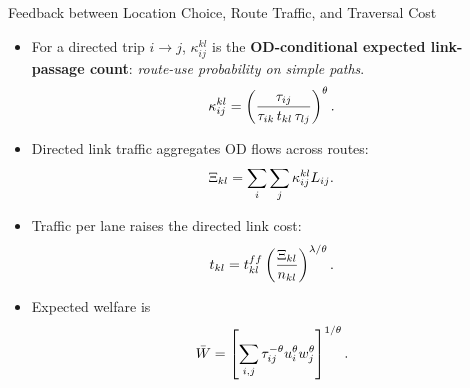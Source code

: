 \documentclass[11pt,aspectratio=169]{beamer}
\begin{document}
\begin{frame}{Feedback between Location Choice, Route Traffic, and Traversal Cost}
\begin{itemize}\footnotesize
  \item For a directed trip $i\to j$, $\kappa^{kl}_{ij}$ is the \textbf{OD-conditional expected link-passage count}: \textit{route-use probability on simple paths}.
  \vspace{-0.8em}\begin{equation}
    \kappa^{kl}_{ij}=\left(\frac{\tau_{ij}}{\tau_{ik}\,t_{kl}\,\tau_{lj}}\right)^\theta.
  \vspace{-0.6em}\end{equation}
  \item Directed link traffic aggregates OD flows across routes:
  \vspace{-0.5em}\begin{equation}\label{eq:Xi_c}
    \Xi_{kl}=\sum_i\sum_j\kappa^{kl}_{ij}L_{ij}.
  \vspace{-0.6em}\end{equation}
  \item Traffic per lane raises the directed link cost:
  \vspace{-0.5em}\begin{equation}\label{eq:c_Xi}
    t_{kl}=t_{kl}^{ff}\left(\frac{\Xi_{kl}}{n_{kl}}\right)^{\lambda/\theta}.
  \vspace{-0.6em}\end{equation}
  \item Expected welfare is
  \vspace{-0.5em}\begin{equation}
    \bar W=\left[\sum_{i,j}\tau_{ij}^{-\theta}u_i^\theta w_j^\theta\right]^{1/\theta}.
  \vspace{-0.8em}\end{equation}
\end{itemize}
\end{frame}
\end{document}
